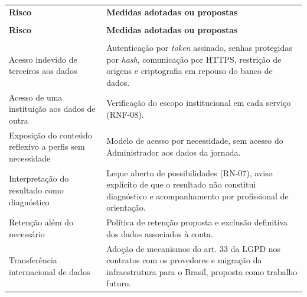{\ABNTEXfontereduzida
\renewcommand{\arraystretch}{1.25}
\begin{xltabular}{\textwidth}{|>{\raggedright\arraybackslash}p{5.0cm}|>{\raggedright\arraybackslash}X|}
 \\[0.3em]
\hline
\textbf{Risco} & \textbf{Medidas adotadas ou propostas} \\
\hline
\endfirsthead
{} \\
\hline
\textbf{Risco} & \textbf{Medidas adotadas ou propostas} \\
\hline
\endhead
{} \\
\endfoot
\endlastfoot
Acesso indevido de terceiros aos dados & Autenticação por \textit{token} assinado, senhas protegidas por \textit{hash}, comunicação por HTTPS, restrição de origens e criptografia em repouso do banco de dados. \\
\hline
Acesso de uma instituição aos dados de outra & Verificação do escopo institucional em cada serviço (RNF-08). \\
\hline
Exposição do conteúdo reflexivo a perfis sem necessidade & Modelo de acesso por necessidade, sem acesso do Administrador aos dados da jornada. \\
\hline
Interpretação do resultado como diagnóstico & Leque aberto de possibilidades (RN-07), aviso explícito de que o resultado não constitui diagnóstico e acompanhamento por profissional de orientação. \\
\hline
Retenção além do necessário & Política de retenção proposta e exclusão definitiva dos dados associados à conta. \\
\hline
Transferência internacional de dados & Adoção de mecanismos do art. 33 da LGPD nos contratos com os provedores e migração da infraestrutura para o Brasil, proposta como trabalho futuro. \\
\hline
\end{xltabular}
}

